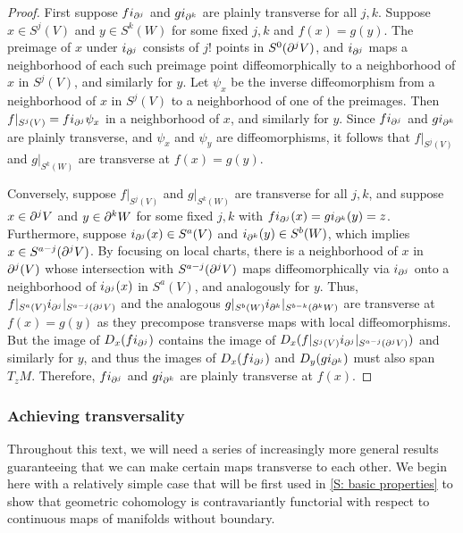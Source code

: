 \begin{proof}
	First suppose $fi_{\partial^j}$ and $gi_{\partial^k}$ are plainly transverse for all $j,k$.
	Suppose $x \in S^j(V)$ and $y \in S^k(W)$ for some fixed $j,k$ and $f(x) = g(y)$.
	The preimage of $x$ under $i_{\partial^j}$ consists of $j!$ points in $S^0(\partial^jV)$, and $i_{\partial^j}$ maps a neighborhood of each such preimage point diffeomorphically to a neighborhood of $x$ in $S^j(V)$, and similarly for $y$.
	Let $\psi_x$ be the inverse diffeomorphism from a neighborhood of $x$ in $S^j(V)$ to a neighborhood of one of the preimages.
	Then $f|_{S^j(V)} = fi_{\partial^j}\psi_x$ in a neighborhood of $x$, and similarly for $y$.
	Since $fi_{\partial^j}$ and $gi_{\partial^k}$ are plainly transverse, and $\psi_x$ and $\psi_y$ are diffeomorphisms, it follows that $f|_{S^j(V)}$ and $g|_{S^k(W)}$ are transverse at $f(x) = g(y)$.

	Conversely, suppose $f|_{S^j(V)}$ and $g|_{S^k(W)}$ are transverse for all $j,k$, and suppose $x \in \partial^jV$ and $y \in \partial^kW$ for some fixed $j,k$ with $fi_{\partial^j}(x) = gi_{\partial^k}(y) = z$.
	Furthermore, suppose $i_{\partial^j}(x) \in S^a(V)$ and $i_{\partial^k}(y) \in S^b(W)$, which implies $x \in S^{a-j}(\partial^j V)$.
	By focusing on local charts, there is a neighborhood of $x$ in $\partial^j(V)$ whose intersection with $S^{a-j}(\partial^j V)$ maps diffeomorphically via $i_{\partial^j}$ onto a neighborhood of $i_{\partial^j}(x)$ in $S^a(V)$, and analogously for $y$.
	Thus, $f|_{S^a(V)}i_{\partial^j}|_{S^{a-j}(\partial^j V)}$ and the analogous $g|_{S^b(W)}i_{\partial^k}|_{S^{b-k}(\partial^k W)}$ are transverse at $f(x) = g(y)$ as they precompose transverse maps with local diffeomorphisms.
	But the image of $D_x(fi_{\partial^j})$ contains the image of $D_x(f|_{S^j(V)}i_{\partial^j}|_{S^{a-j}(\partial^j V)})$ and similarly for $y$, and thus the images of $D_x(fi_{\partial^j})$ and $D_y(gi_{\partial^k})$ must also span $T_{z}M$.
	Therefore, $fi_{\partial^j}$ and $gi_{\partial^k}$ are plainly transverse at $f(x)$.
\end{proof}

\subsubsection{Achieving transversality}

Throughout this text, we will need a series of increasingly more general results guaranteeing that we can make certain maps transverse to each other.
We begin here with a relatively simple case that will be first used in \cref{S: basic properties} to show that geometric cohomology is contravariantly functorial with respect to continuous maps of manifolds without boundary.

